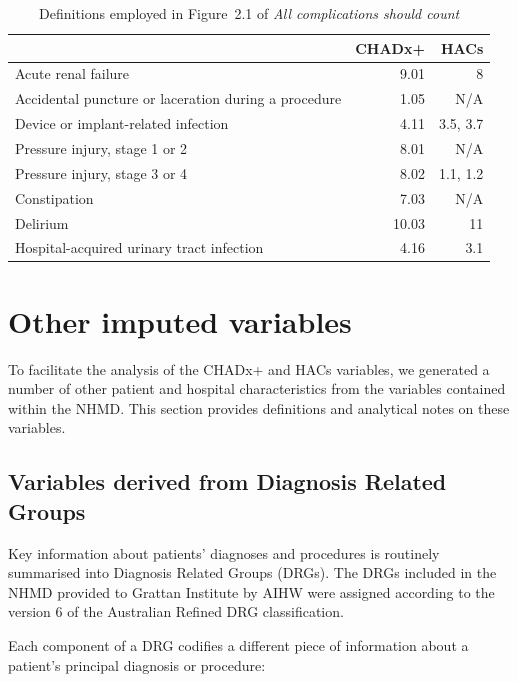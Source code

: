 \documentclass[submission]{grattan}
\newcommand*{\Figure}[1]{Figure~#1}
\newcommand*{\myTitle}{All complications should count}
\begin{document}
\begin{table}
\caption{Definitions employed in \Figure{2.1} of \textit{\myTitle}}\label{tbl:Definitions-employed-in-mainmatter}
\begin{tabularx}{\linewidth}{Xrr}
\toprule
                                                     & \textbf{CHADx+} & \textbf{HACs}\tabularnewline
\midrule
Acute renal failure                                  & 9.01            & 8\tabularnewline
Accidental puncture or laceration during a procedure & 1.05            & N/A\tabularnewline
Device or implant-related infection                  & 4.11            & 3.5, 3.7\tabularnewline
Pressure injury, stage 1 or 2                        & 8.01            & N/A\tabularnewline
Pressure injury, stage 3 or 4                        & 8.02            & 1.1, 1.2\tabularnewline
Constipation                                         & 7.03            & N/A\tabularnewline
Delirium                                             & 10.03           & 11\tabularnewline
Hospital-acquired urinary tract infection            & 4.16            & 3.1\tabularnewline
\bottomrule
\end{tabularx}
\end{table}

\section{Other imputed variables}\label{sec:other-imputed-variables}

To facilitate the analysis of the CHADx+ and HACs variables, we generated a number of other patient and hospital characteristics from the variables contained within the NHMD\@.
This section provides definitions and analytical notes on these variables.

\subsection{Variables derived from Diagnosis Related Groups}\label{subsec:variables-derived-from-diagnosis-related-groups}

Key information about patients' diagnoses and procedures is routinely summarised into Diagnosis Related Groups (DRGs).
The DRGs included in the NHMD provided to Grattan Institute by AIHW were assigned according to the version 6 of the Australian Refined DRG classification.

Each component of a DRG codifies a different piece of information about a patient's principal diagnosis or procedure:
\end{document}

